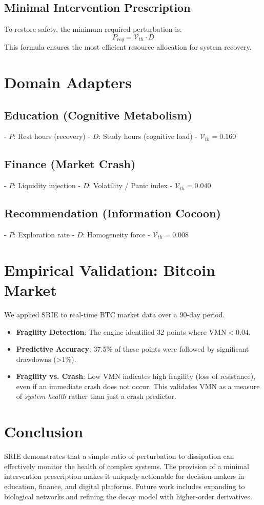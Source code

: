 \documentclass{article}
\begin{document}
\subsection{Minimal Intervention Prescription}
To restore safety, the minimum required perturbation is:
\begin{equation}
P_{req} = \mathcal{V}_{th} \cdot D
\end{equation}
This formula ensures the most efficient resource allocation for system recovery.

\section{Domain Adapters}
\subsection{Education (Cognitive Metabolism)}
- $P$: Rest hours (recovery)
- $D$: Study hours (cognitive load)
- $\mathcal{V}_{th} = 0.160$

\subsection{Finance (Market Crash)}
- $P$: Liquidity injection
- $D$: Volatility / Panic index
- $\mathcal{V}_{th} = 0.040$

\subsection{Recommendation (Information Cocoon)}
- $P$: Exploration rate
- $D$: Homogeneity force
- $\mathcal{V}_{th} = 0.008$

\section{Empirical Validation: Bitcoin Market}
We applied SRIE to real-time BTC market data over a 90-day period.
\begin{itemize}
    \item \textbf{Fragility Detection}: The engine identified 32 points where $\text{VMN} < 0.04$.
    \item \textbf{Predictive Accuracy}: 37.5\% of these points were followed by significant drawdowns (>1\%).
    \item \textbf{Fragility vs. Crash}: Low VMN indicates high fragility (loss of resistance), even if an immediate crash does not occur. This validates VMN as a measure of \textit{system health} rather than just a crash predictor.
\end{itemize}

\section{Conclusion}
SRIE demonstrates that a simple ratio of perturbation to dissipation can effectively monitor the health of complex systems. The provision of a minimal intervention prescription makes it uniquely actionable for decision-makers in education, finance, and digital platforms. Future work includes expanding to biological networks and refining the decay model with higher-order derivatives.
\end{document}
